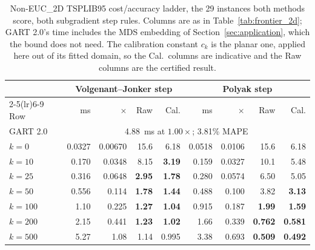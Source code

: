 \begin{table}[!htbp]
\centering
\caption{Non-EUC\_2D TSPLIB95 cost/accuracy ladder, the 29 instances both methods score, both subgradient step rules. Columns are as in Table~\ref{tab:frontier_2d}; GART 2.0's time includes the MDS embedding of Section~\ref{sec:application}, which the bound does not need. The calibration constant $c_k$ is the planar one, applied here out of its fitted domain, so the Cal.\ columns are indicative and the Raw columns are the certified result.}
\label{tab:frontier_noneuc}
\setlength{\tabcolsep}{5pt}
\renewcommand{\arraystretch}{1.1}
\begin{tabular}{@{}lrrrrrrrr@{}}
\toprule
 & \multicolumn{4}{c}{Volgenant--Jonker step} & \multicolumn{4}{c}{Polyak step} \\
\cmidrule(lr){2-5}\cmidrule(lr){6-9}
Row & ms & $\times$ & Raw & Cal. & ms & $\times$ & Raw & Cal. \\
\midrule
GART 2.0 & \multicolumn{8}{c}{4.88~ms at $1.00\times$; 3.81\% MAPE} \\
$k=0$ & 0.0327 & 0.00670 & 15.6 & 6.18 & 0.0518 & 0.0106 & 15.6 & 6.18 \\
$k=10$ & 0.170 & 0.0348 & 8.15 & \textbf{3.19} & 0.159 & 0.0327 & 10.1 & 5.48 \\
$k=25$ & 0.316 & 0.0648 & \textbf{2.95} & \textbf{1.78} & 0.280 & 0.0574 & 6.50 & 5.05 \\
$k=50$ & 0.556 & 0.114 & \textbf{1.78} & \textbf{1.44} & 0.488 & 0.100 & 3.82 & \textbf{3.13} \\
$k=100$ & 1.10 & 0.225 & \textbf{1.27} & \textbf{1.04} & 0.915 & 0.187 & \textbf{1.99} & \textbf{1.59} \\
$k=200$ & 2.15 & 0.441 & \textbf{1.23} & \textbf{1.02} & 1.66 & 0.339 & \textbf{0.762} & \textbf{0.581} \\
$k=500$ & 5.27 & 1.08 & 1.14 & 0.995 & 3.38 & 0.693 & \textbf{0.509} & \textbf{0.492} \\
\bottomrule
\end{tabular}
\end{table}
